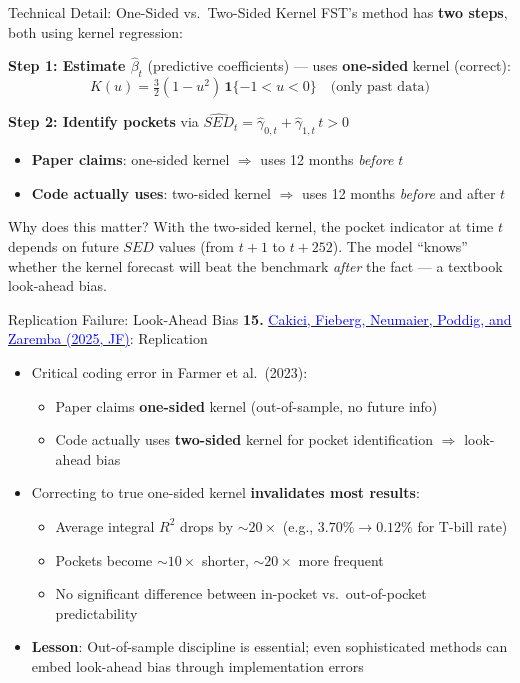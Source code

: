 \documentclass{beamer}
\begin{document}
\begin{frame}{Technical Detail: One-Sided vs.\ Two-Sided Kernel}
	FST's method has \textbf{two steps}, both using kernel regression:

	\vspace{5pt}
	\textbf{Step 1: Estimate $\hat{\beta}_t$} (predictive coefficients) --- uses \textbf{one-sided} kernel (correct):
	\[
		K(u) = \tfrac{3}{2}(1-u^2)\,\mathbf{1}\{-1 < u < 0\} \quad \text{(only past data)}
	\]

	\textbf{Step 2: Identify pockets} via $\widehat{SED}_t = \hat{\gamma}_{0,t} + \hat{\gamma}_{1,t}\,t > 0$
	\begin{itemize}
		\item \textbf{Paper claims}: one-sided kernel $\Rightarrow$ uses 12 months \textit{before} $t$
		\item \textbf{Code actually uses}: two-sided kernel $\Rightarrow$ uses 12 months \textit{before} \alert{and after} $t$
	\end{itemize}

	\vspace{5pt}
	\begin{block}{Why does this matter?}
	With the two-sided kernel, the pocket indicator at time $t$ depends on \alert{future} $SED$ values (from $t+1$ to $t+252$). The model ``knows'' whether the kernel forecast will beat the benchmark \textit{after} the fact --- a textbook \alert{look-ahead bias}.
	\end{block}
\end{frame}

\begin{frame}{Replication Failure: Look-Ahead Bias}
	\textbf{15.} \href{https://doi.org/10.1111/jofi.13484}{\textcolor{blue}{Cakici, Fieberg, Neumaier, Poddig, and Zaremba (2025, JF)}}: Replication
	\begin{itemize}
		\item \alert{Critical coding error} in Farmer et al.\ (2023):
		\begin{itemize}
			\item Paper claims \textbf{one-sided} kernel (out-of-sample, no future info)
			\item Code actually uses \textbf{two-sided} kernel for pocket identification $\Rightarrow$ \alert{look-ahead bias}
		\end{itemize}
		\item Correcting to true one-sided kernel \textbf{invalidates most results}:
		\begin{itemize}
			\item Average integral $R^2$ drops by $\sim 20\times$ (e.g., $3.70\% \to 0.12\%$ for T-bill rate)
			\item Pockets become $\sim 10\times$ shorter, $\sim 20\times$ more frequent
			\item No significant difference between in-pocket vs.\ out-of-pocket predictability
		\end{itemize}
		\item \textbf{Lesson}: Out-of-sample discipline is essential; even sophisticated methods can embed look-ahead bias through implementation errors
	\end{itemize}
\end{frame}
\end{document}
